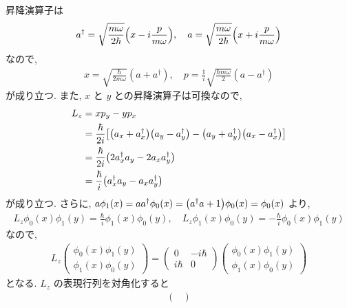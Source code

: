 \documentclass[../../ou-physics-exam.tex]{subfiles}
\begin{document}
\begin{answer}
    昇降演算子は
    \begin{align*}
        a^{\dagger} = \sqrt{\frac{m \omega}{2 \hbar}} \qty(x - i \frac{p}{m \omega}) , \quad a = \sqrt{\frac{m \omega}{2 \hbar}} \qty(x + i \frac{p}{m \omega})
    \end{align*}
    なので,
    \begin{align*}
        x = \sqrt{\frac{\hbar}{2m \omega}} (a + a^{\dagger}), \quad p = \frac{1}{i} \sqrt{\frac{\hbar m \omega}{2}} (a - a^{\dagger})
    \end{align*}
    が成り立つ. 
    また, $ x $ と $ y $ との昇降演算子は可換なので,
    \begin{align*}
        L_z 
        & = xp_y - yp_x \\
        & = \frac{\hbar}{2i} \qty[\qty(a_x + a_x^{\dagger}) \qty(a_y - a_y^{\dagger}) - \qty(a_y + a_y^{\dagger}) \qty(a_x - a_x^{\dagger})] \\
        & = \frac{\hbar}{2i} \qty(2a_x^{\dagger} a_y - 2a_x a_y^{\dagger}) \\
        & = \frac{\hbar}{i} \qty(a_x^{\dagger} a_y - a_x a_y^{\dagger})
    \end{align*}
    が成り立つ. 
    さらに, $ a \phi_1 (x) = a a^{\dagger} \phi_0 (x) = \qty(a^{\dagger} a + 1) \phi_0 (x) = \phi_0 (x) $ より,
    \begin{align*}
        L_z \phi_0 (x) \phi_1 (y) = \frac{\hbar}{i} \phi_1 (x) \phi_0 (y), \quad L_z \phi_1 (x) \phi_0 (y) = - \frac{\hbar}{i} \phi_0 (x) \phi_1 (y)
    \end{align*}
    なので,
    \begin{align*}
        L_z 
        \begin{pmatrix}
            \phi_0 (x) \phi_1 (y) \\
            \phi_1 (x) \phi_0 (y)
        \end{pmatrix}
        = 
        \begin{pmatrix}
            0 & -i \hbar \\
            i \hbar & 0
        \end{pmatrix}
        \begin{pmatrix}
            \phi_0 (x) \phi_1 (y) \\
            \phi_1 (x) \phi_0 (y)
        \end{pmatrix}
    \end{align*}
    となる.
    $ L_z $ の表現行列を対角化すると
    \begin{align*}
        \begin{pmatrix}

\end{pmatrix}
\end{align*}
\end{answer}
\end{document}
